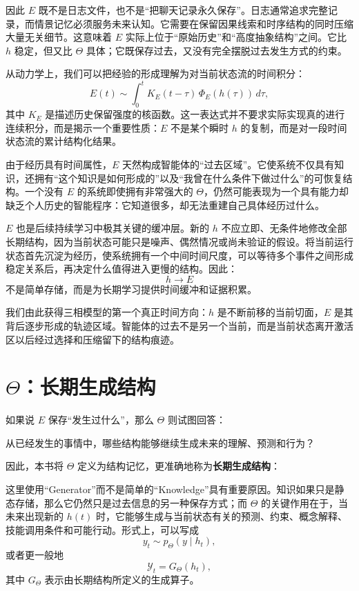 因此 $E$ 既不是日志文件，也不是“把聊天记录永久保存”。日志通常追求完整记录，而情景记忆必须服务未来认知。它需要在保留因果线索和时序结构的同时压缩大量无关细节。这意味着 $E$ 实际上位于“原始历史”和“高度抽象结构”之间。它比 $h$ 稳定，但又比 $\Theta$ 具体；它既保存过去，又没有完全摆脱过去发生方式的约束。

从动力学上，我们可以把经验的形成理解为对当前状态流的时间积分：
\[
E(t)
\sim
\int_{0}^{t}
K_E(t-\tau)\,
\Phi_E(h(\tau))
\,d\tau,
\]
其中 $K_E$ 是描述历史保留强度的核函数。这一表达式并不要求实际实现真的进行连续积分，而是揭示一个重要性质：$E$ 不是某个瞬时 $h$ 的复制，而是对一段时间状态流的累计结构化结果。

由于经历具有时间属性，$E$ 天然构成智能体的“过去区域”。它使系统不仅具有知识，还拥有“这个知识是如何形成的”以及“我曾在什么条件下做过什么”的可恢复结构。一个没有 $E$ 的系统即使拥有非常强大的 $\Theta$，仍然可能表现为一个具有能力却缺乏个人历史的智能程序：它知道很多，却无法重建自己具体经历过什么。

$E$ 也是后续持续学习中极其关键的缓冲层。新的 $h$ 不应立即、无条件地修改全部长期结构，因为当前状态可能只是噪声、偶然情况或尚未验证的假设。将当前运行状态首先沉淀为经历，使系统拥有一个中间时间尺度，可以等待多个事件之间形成稳定关系后，再决定什么值得进入更慢的结构。因此：
\[
h\rightarrow E
\]
不是简单存储，而是为长期学习提供时间缓冲和证据积累。

我们由此获得三相模型的第一个真正时间方向：$h$ 是不断前移的当前切面，$E$ 是其背后逐步形成的轨迹区域。智能体的过去不是另一个当前，而是当前状态离开激活区以后经过选择和压缩留下的结构痕迹。

\section{$\Theta$：长期生成结构}

如果说 $E$ 保存“发生过什么”，那么 $\Theta$ 则试图回答：
\begin{statementbox}
从已经发生的事情中，哪些结构能够继续生成未来的理解、预测和行为？
\end{statementbox}
因此，本书将 $\Theta$ 定义为结构记忆，更准确地称为\textbf{长期生成结构}：
\begin{statementbox}
\centering
{}
\end{statementbox}

这里使用“Generator”而不是简单的“Knowledge”具有重要原因。知识如果只是静态存储，那么它仍然只是过去信息的另一种保存方式；而 $\Theta$ 的关键作用在于，当未来出现新的 $h(t)$ 时，它能够生成与当前状态有关的预测、约束、概念解释、技能调用条件和可能行动。形式上，可以写成
\[
y_t
\sim
p_\Theta
\left(
y
\mid
h_t
\right),
\]
或者更一般地
\[
\mathcal{Y}_t
=
G_\Theta(h_t),
\]
其中 $G_\Theta$ 表示由长期结构所定义的生成算子。

